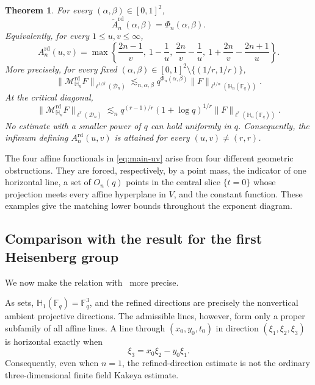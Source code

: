 \documentclass[11pt,letterpaper]{amsart}
\numberwithin{equation}{section}
\newtheorem{theorem}{Theorem}[section]
\theoremstyle{definition}
\theoremstyle{remark}
\newcommand{\Fq}{\mathbb F_q}
\newcommand{\HH}{\mathbb H}
\newcommand{\Dn}{\mathcal D_n}
\newcommand{\Mrd}{\mathcal M^{\mathrm{rd}}_{\HH_n}}
\newcommand{\norm}[1]{\lVert #1\rVert}
\begin{document}
\begin{theorem}
\label{thm:main}
For every $(\alpha,\beta)\in[0,1]^2$,
\begin{equation}\label{eq:main-phase}
 \widetilde A_n^{\mathrm{rd}}(\alpha,\beta)
 =
 \Phi_n(\alpha,\beta).
\end{equation}
Equivalently, for every $1\leq u,v\leq\infty$,
\begin{equation}\label{eq:main-uv}
 A_n^{\mathrm{rd}}(u,v)
 =
 \max\left\{
 \frac{2n-1}{v},\
 1-\frac1u,\
 \frac{2n}{v}-\frac1u,\
 1+\frac{2n}{v}-\frac{2n+1}{u}
 \right\}.
\end{equation}
More precisely, for every fixed
$(\alpha,\beta)\in[0,1]^2\setminus\{(1/r,1/r)\}$,
\begin{equation}\label{eq:main-quantitative}
 \norm{\Mrd F}_{\ell^{1/\beta}(\Dn)}
 \lesssim_{n,\alpha,\beta}
 q^{\Phi_n(\alpha,\beta)}
 \norm{F}_{\ell^{1/\alpha}(\HH_n(\Fq))}.
\end{equation}
At the critical diagonal,
\begin{equation}\label{eq:main-quantitative-diagonal}
 \norm{\Mrd F}_{\ell^r(\Dn)}
 \lesssim_n
 q^{(r-1)/r}(1+\log q)^{1/r}
 \norm{F}_{\ell^r(\HH_n(\Fq))}.
\end{equation}
No estimate with a smaller power of $q$ can hold uniformly in $q$.
Consequently, the infimum defining $A_n^{\mathrm{rd}}(u,v)$ is attained for every $(u,v)\neq(r,r)$.
\end{theorem}
The four affine functionals in \eqref{eq:main-uv} arise from four
different geometric obstructions.  They are forced, respectively, by a point mass, the indicator of one horizontal line, a set of $O_n(q)$ points in the central slice $\{t=0\}$ whose projection meets every affine hyperplane in $V$, and the constant function.  These examples give the matching lower bounds throughout the exponent diagram.





\subsection{Comparison with the result for the first Heisenberg group}

We now make the relation with~\cite{PPTX26} more precise.

As sets, $\HH_1(\Fq)=\Fq^3$, and the refined directions are precisely
the nonvertical ambient projective directions.  The admissible lines,
however, form only a proper subfamily of all affine lines.  A line
through $(x_0,y_0,t_0)$ in direction
$(\xi_1,\xi_2,\xi_3)$ is horizontal exactly when
\[
 \xi_3=x_0\xi_2-y_0\xi_1.
\]
Consequently, even when $n=1$, the refined-direction estimate is not the ordinary three-dimensional finite field Kakeya estimate.
\end{document}
